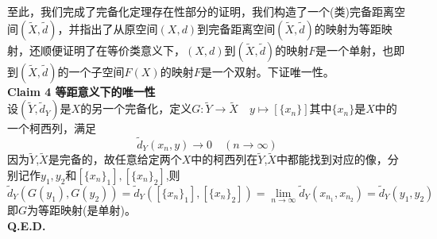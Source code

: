 至此，我们完成了完备化定理存在性部分的证明，我们构造了一个(类)完备距离空间$(\tilde{X},\tilde{d})$，并指出了从原空间$(X,d)$到完备距离空间$(\tilde{X},\tilde{d})$的映射为等距映射，还顺便证明了在等价类意义下，$(X,d)$到$(\tilde{X},\tilde{d})$的映射$F$是一个单射，也即到$(\tilde{X},\tilde{d})$的一个子空间$F(X)$的映射$F$是一个双射。下证唯一性。\\
\textbf{Claim 4 等距意义下的唯一性}\\
设$(\tilde{Y},\tilde{d}_Y)$是$X$的另一个完备化，定义$G:\tilde{Y} \to \tilde{X} \quad y \mapsto [\{x_n\}]$其中$\{x_n\}$是$X$中的一个柯西列，满足
\[\tilde{d}_Y(x_n,y) \to 0 \quad (n \to \infty)\]
因为$\tilde{Y}$,$\tilde{X}$是完备的，故任意给定两个$X$中的柯西列在$\tilde{Y}$,$\tilde{X}$中都能找到对应的像，分别记作$y_1,y_2$和$[\{x_n\}_1],[\{x_n\}_2]$,则
\[\tilde{d}_Y(G(y_1),G(y_2))=\tilde{d}_Y([\{x_n\}_1],[\{x_n\}_2])=\lim_{n \to \infty}\tilde{d}_Y(x_{n_1},x_{n_2})=\tilde{d}_Y(y_1,y_2)\]
即$G$为等距映射(是单射)。\\
\textbf{Q.E.D.}

